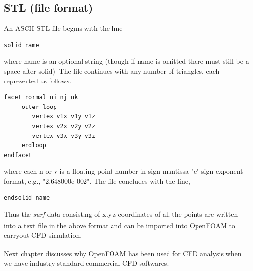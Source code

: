 \subsection{STL (file format)}
An ASCII STL file begins with the line
\begin{lstlisting}
solid name
\end{lstlisting}



where name is an optional string (though if name is omitted there must still be a space after solid). The file continues with any number of triangles, each represented as follows:
\begin{lstlisting}
facet normal ni nj nk 
	 outer loop	
		vertex v1x v1y v1z 
		vertex v2x v2y v2z 
		vertex v3x v3y v3z 
	 endloop 
endfacet 
\end{lstlisting}

where each n or v is a floating-point number in sign-mantissa-"e"-sign-exponent format, e.g., "2.648000e-002". The file concludes with the line,


\begin{lstlisting}
endsolid name
\end{lstlisting}

Thus the \textit{surf} data consisting of x,y,z coordinates of all the points are written into a text file in the above format and can be imported into OpenFOAM\textsuperscript{\textregistered} to carryout CFD simulation.

Next chapter discusses why OpenFOAM\textsuperscript{\textregistered} has been used for CFD analysis when we have industry standard commercial CFD softwares.



